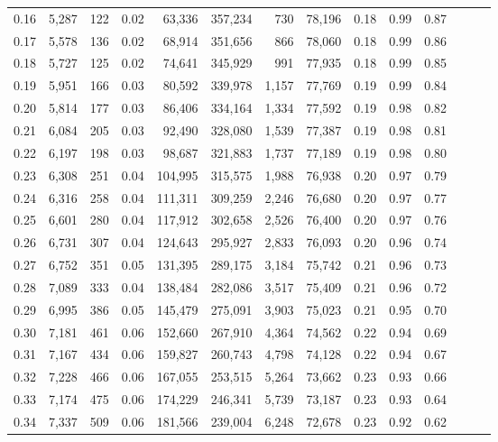 \begin{tabular}{rrrrrrrrrrrrrr}
0.16 &  5,287 &    122 &  0.02 &   63,336 &  357,234 &     730 &  78,196 &  0.18 &  0.99 &      0.87 \\
0.17 &  5,578 &    136 &  0.02 &   68,914 &  351,656 &     866 &  78,060 &  0.18 &  0.99 &      0.86 \\
0.18 &  5,727 &    125 &  0.02 &   74,641 &  345,929 &     991 &  77,935 &  0.18 &  0.99 &      0.85 \\
0.19 &  5,951 &    166 &  0.03 &   80,592 &  339,978 &   1,157 &  77,769 &  0.19 &  0.99 &      0.84 \\
0.20 &  5,814 &    177 &  0.03 &   86,406 &  334,164 &   1,334 &  77,592 &  0.19 &  0.98 &      0.82 \\
0.21 &  6,084 &    205 &  0.03 &   92,490 &  328,080 &   1,539 &  77,387 &  0.19 &  0.98 &      0.81 \\
0.22 &  6,197 &    198 &  0.03 &   98,687 &  321,883 &   1,737 &  77,189 &  0.19 &  0.98 &      0.80 \\
0.23 &  6,308 &    251 &  0.04 &  104,995 &  315,575 &   1,988 &  76,938 &  0.20 &  0.97 &      0.79 \\
0.24 &  6,316 &    258 &  0.04 &  111,311 &  309,259 &   2,246 &  76,680 &  0.20 &  0.97 &      0.77 \\
0.25 &  6,601 &    280 &  0.04 &  117,912 &  302,658 &   2,526 &  76,400 &  0.20 &  0.97 &      0.76 \\
0.26 &  6,731 &    307 &  0.04 &  124,643 &  295,927 &   2,833 &  76,093 &  0.20 &  0.96 &      0.74 \\
0.27 &  6,752 &    351 &  0.05 &  131,395 &  289,175 &   3,184 &  75,742 &  0.21 &  0.96 &      0.73 \\
0.28 &  7,089 &    333 &  0.04 &  138,484 &  282,086 &   3,517 &  75,409 &  0.21 &  0.96 &      0.72 \\
0.29 &  6,995 &    386 &  0.05 &  145,479 &  275,091 &   3,903 &  75,023 &  0.21 &  0.95 &      0.70 \\
0.30 &  7,181 &    461 &  0.06 &  152,660 &  267,910 &   4,364 &  74,562 &  0.22 &  0.94 &      0.69 \\
0.31 &  7,167 &    434 &  0.06 &  159,827 &  260,743 &   4,798 &  74,128 &  0.22 &  0.94 &      0.67 \\
0.32 &  7,228 &    466 &  0.06 &  167,055 &  253,515 &   5,264 &  73,662 &  0.23 &  0.93 &      0.66 \\
0.33 &  7,174 &    475 &  0.06 &  174,229 &  246,341 &   5,739 &  73,187 &  0.23 &  0.93 &      0.64 \\
0.34 &  7,337 &    509 &  0.06 &  181,566 &  239,004 &   6,248 &  72,678 &  0.23 &  0.92 &      0.62 \\

\end{tabular}
